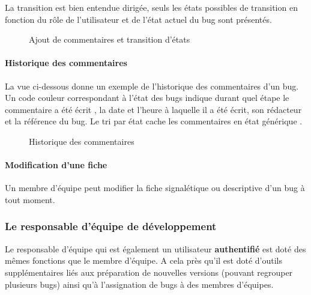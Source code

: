 \documentclass{article}[12pt]
\begin{document}
 La transition est bien entendue dirigée, seuls les états possibles de transition en fonction du rôle de l'utilisateur et de l'état actuel du bug sont présentés.
\begin{figure}[H]
	\centering
	\caption{Ajout de commentaires et transition d'états}
\end{figure}

\paragraph{Historique des commentaires}
La vue ci-dessous donne un exemple de l'historique des commentaires d'un bug. Un code couleur correspondant à l'état des bugs indique durant quel étape le commentaire a été écrit , la date et l'heure à laquelle il a été écrit, son rédacteur et la référence du bug. Le tri par état cache les commentaires en état \og générique \fg.
\begin{figure}[H]
	\centering
	\caption{Historique des commentaires}
\end{figure}

 \paragraph{Modification d'une fiche}
 Un membre d'équipe peut modifier la fiche signalétique ou descriptive d'un bug à tout moment. 
 \newpage
\subsubsection{Le responsable d'équipe de développement}
\label{responsable}
Le responsable d'équipe qui est également un utilisateur \textbf{authentifié} est doté des mêmes fonctions que le membre d'équipe. A cela près qu'il est doté d'outils supplémentaires liés aux préparation de nouvelles versions (pouvant regrouper plusieurs bugs) ainsi qu'à l'assignation de bugs à des membres d'équipes. 
\end{document}
